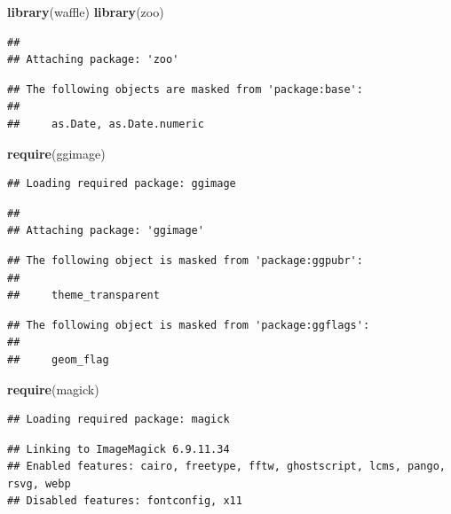 \documentclass[11pt,a4paper,]{article}
\newenvironment{Shaded}{\begin{snugshade}}{\end{snugshade}}
\newcommand{\KeywordTok}[1]{\textcolor[rgb]{0.13,0.29,0.53}{\textbf{#1}}}
\newcommand{\NormalTok}[1]{#1}
\begin{document}
\begin{Shaded}
\begin{Highlighting}[]
\KeywordTok{library}\NormalTok{(waffle)}
\KeywordTok{library}\NormalTok{(zoo)}
\end{Highlighting}
\end{Shaded}

\begin{verbatim}
## 
## Attaching package: 'zoo'
\end{verbatim}

\begin{verbatim}
## The following objects are masked from 'package:base':
## 
##     as.Date, as.Date.numeric
\end{verbatim}

\begin{Shaded}
\begin{Highlighting}[]
\KeywordTok{require}\NormalTok{(ggimage)}
\end{Highlighting}
\end{Shaded}

\begin{verbatim}
## Loading required package: ggimage
\end{verbatim}

\begin{verbatim}
## 
## Attaching package: 'ggimage'
\end{verbatim}

\begin{verbatim}
## The following object is masked from 'package:ggpubr':
## 
##     theme_transparent
\end{verbatim}

\begin{verbatim}
## The following object is masked from 'package:ggflags':
## 
##     geom_flag
\end{verbatim}

\begin{Shaded}
\begin{Highlighting}[]
\KeywordTok{require}\NormalTok{(magick)}
\end{Highlighting}
\end{Shaded}

\begin{verbatim}
## Loading required package: magick
\end{verbatim}

\begin{verbatim}
## Linking to ImageMagick 6.9.11.34
## Enabled features: cairo, freetype, fftw, ghostscript, lcms, pango, rsvg, webp
## Disabled features: fontconfig, x11
\end{verbatim}
\end{document}

